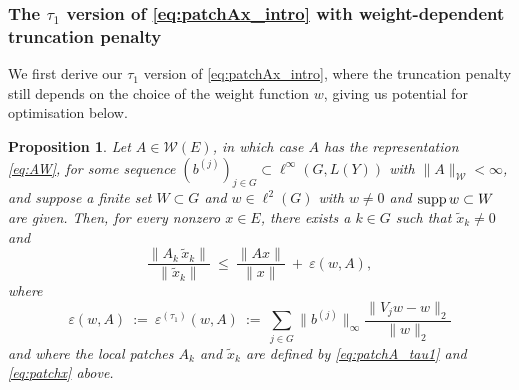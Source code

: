 \documentclass{article}
\newcommand\W{{\mathcal W}}
\newcommand\eps{{\varepsilon}}
\newcommand\supp{{\rm supp\,}}
\newtheorem{proposition}[theorem]{Proposition}
\numberwithin{equation}{section}   %
\numberwithin{figure}{section}  %
\begin{document}
\subsubsection{The $\tau_1$ version of \eqref{eq:patchAx_intro} with weight-dependent truncation penalty}
We first derive our $\tau_1$ version of \eqref{eq:patchAx_intro}, where the truncation penalty still depends on the choice of the weight function $w$, giving us potential for optimisation below.

\begin{proposition} \label{prop:tau1}
Let $A\in \W(E)$, in which case $A$ has the representation \eqref{eq:AW},
for some sequence $(b^{(j)})_{j\in G} \subset \ell^\infty(G,L(Y))$ with $\|A\|_\W <\infty$, and 
suppose a finite set $W\subset G$ and  %
 $w\in \ell^2(G)$ with $w\neq 0$ and $\supp w\subset W$ 
 are given. Then, for every nonzero $x\in E$, there exists a $k\in G$ such that $\tilde x_k\ne 0$ and
\begin{equation} \label{eq:patchAx_tau1}
\frac{\|A_{k}\, \tilde x_{k}\|}{\| \tilde x_{k}\|}\ \le\ \frac{\|Ax\|}{\|x\|}\ +\ \eps(w,A),
\end{equation}
where
\begin{equation} \label{eq:pen_tau1}
\eps(w,A)\ :=\ \eps^{(\tau_1)}(w,A)\ :=\ \sum_{j\in G} \|b^{(j)}\|_\infty \frac{\|V_jw-w\|_2}{\|w\|_2}
\end{equation}
and where the local patches $A_k$ and $\tilde x_k$ are defined by \eqref{eq:patchA_tau1} and \eqref{eq:patchx} above.
\end{proposition}
\end{document}
